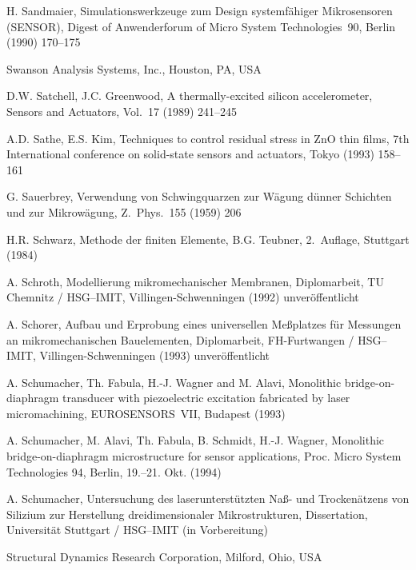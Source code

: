 \begin{thebibliography}{xxx}
 H. Sandmaier, Simulationswerkzeuge zum Design systemfähiger Mikrosensoren
 ({\sf SENSOR}), Digest of Anwenderforum of Micro System Technologies~90,
 Berlin (1990) 170--175

 Swanson Analysis Systems, Inc., Houston, PA, USA

 D.W. Satchell, J.C. Greenwood, A thermally-excited silicon accelerometer,
 Sensors and Actuators, Vol.~17 (1989) 241--245

 A.D. Sathe, E.S. Kim, Techniques to control residual stress in ZnO thin
 films, 7th International conference on solid-state sensors and actuators,
 Tokyo (1993) 158--161

 G. Sauerbrey, Verwendung von Schwingquarzen zur Wägung dünner Schichten und
 zur Mikrowägung, Z.~Phys.~155 (1959) 206

  H.R. Schwarz, Methode der finiten Elemente, B.G. Teubner, 2.~Auflage,
  Stuttgart (1984)

 A. Schroth, Modellierung mikromechanischer Membranen, Diplomarbeit,
 TU Chemnitz / HSG--IMIT, Villingen-Schwenningen (1992) unveröffentlicht

 A. Schorer, Aufbau und Erprobung eines universellen Meßplatzes für
 Messungen an mikromechanischen Bauelementen, Diplomarbeit,
 FH-Furtwangen / HSG--IMIT, Villingen-Schwenningen (1993) unveröffentlicht

 A. Schumacher, Th. Fabula, H.-J. Wagner and M. Alavi,
 Monolithic bridge-on-diaphragm transducer with piezoelectric excitation
 fabricated by laser micromachining, EUROSENSORS~VII, Budapest (1993)

 A. Schumacher, M. Alavi, Th. Fabula, B. Schmidt, H.-J. Wagner,
 Monolithic bridge-on-diaphragm microstructure for sensor applications,
 Proc. Micro System Technologies 94, Berlin, 19.--21. Okt. (1994)

 A. Schumacher, Untersuchung des laserunterstützten Naß- und Trockenätzens
 von Silizium zur Herstellung dreidimensionaler Mikrostrukturen,
 Dissertation, Universität Stuttgart / HSG--IMIT (in Vorbereitung)

 Structural Dynamics Research Corporation, Milford, Ohio, USA


\end{thebibliography}
